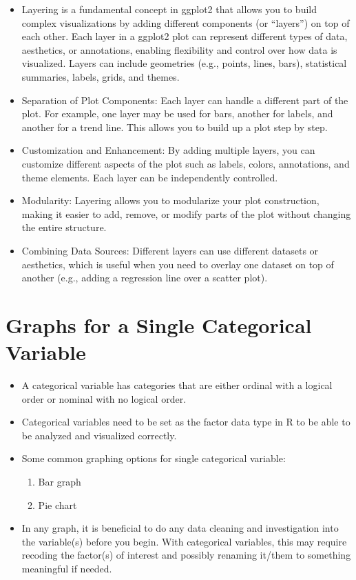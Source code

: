 \documentclass[
  letterpaper,
  DIV=11,
  numbers=noendperiod]{scrreprt}
\providecommand{\tightlist}{%
  \setlength{\itemsep}{0pt}\setlength{\parskip}{0pt}}\usepackage{longtable,booktabs,array}
\begin{document}
\begin{itemize}
\tightlist
\item
  Layering is a fundamental concept in ggplot2 that allows you to build
  complex visualizations by adding different components (or ``layers'')
  on top of each other. Each layer in a ggplot2 plot can represent
  different types of data, aesthetics, or annotations, enabling
  flexibility and control over how data is visualized. Layers can
  include geometries (e.g., points, lines, bars), statistical summaries,
  labels, grids, and themes.
\item
  Separation of Plot Components: Each layer can handle a different part
  of the plot. For example, one layer may be used for bars, another for
  labels, and another for a trend line. This allows you to build up a
  plot step by step.
\item
  Customization and Enhancement: By adding multiple layers, you can
  customize different aspects of the plot such as labels, colors,
  annotations, and theme elements. Each layer can be independently
  controlled.
\item
  Modularity: Layering allows you to modularize your plot construction,
  making it easier to add, remove, or modify parts of the plot without
  changing the entire structure.
\item
  Combining Data Sources: Different layers can use different datasets or
  aesthetics, which is useful when you need to overlay one dataset on
  top of another (e.g., adding a regression line over a scatter plot).
\end{itemize}

\section{Graphs for a Single Categorical
Variable}\label{graphs-for-a-single-categorical-variable}

\begin{itemize}
\tightlist
\item
  A categorical variable has categories that are either ordinal with a
  logical order or nominal with no logical order.
\item
  Categorical variables need to be set as the factor data type in R to
  be able to be analyzed and visualized correctly.
\item
  Some common graphing options for single categorical variable:

  \begin{enumerate}
  \def\labelenumi{\arabic{enumi}.}
  \tightlist
  \item
    Bar graph
  \item
    Pie chart
  \end{enumerate}
\item
  In any graph, it is beneficial to do any data cleaning and
  investigation into the variable(s) before you begin. With categorical
  variables, this may require recoding the factor(s) of interest and
  possibly renaming it/them to something meaningful if needed.
\end{itemize}
\end{document}
